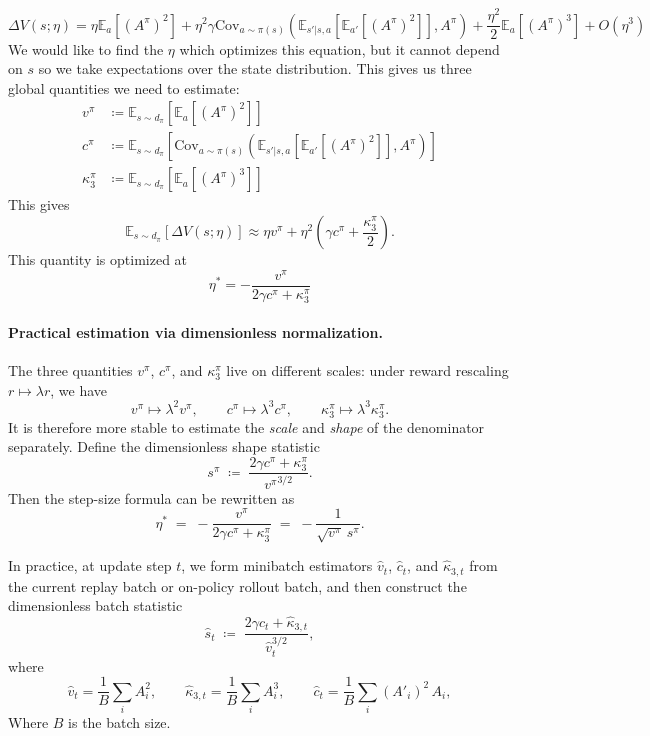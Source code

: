 \documentclass[11pt]{article}
\theoremstyle{definition}
\theoremstyle{remark}
\newcommand{\E}{\mathbb{E}}
\begin{document}
\begin{equation}
  \Delta V(s;\eta) = \eta\E_a[(A^\pi)^2] + \eta^2\gamma\mathrm{Cov}_{a\sim\pi(s)}(\E_{s'|s,a}[\E_{a'}[(A^\pi)^2]],A^\pi) + \frac{\eta^2}{2}\E_a[(A^\pi)^3] + O(\eta^3)
\end{equation}
We would like to find the $\eta$ which optimizes this equation, but it cannot depend on $s$ so we take expectations over the state distribution. This gives us three global quantities we need to estimate:
\begin{align}
    v^\pi &\coloneqq \E_{s\sim d_\pi}[\E_a[(A^\pi)^2]]\nonumber\\
    c^\pi &\coloneqq \E_{s\sim d_\pi}[\mathrm{Cov}_{a\sim\pi(s)}(\E_{s'|s,a}[\E_{a'}[(A^\pi)^2]],A^\pi)]\nonumber\\
    \kappa_3^\pi &\coloneqq \E_{s\sim d_\pi}[\E_a[(A^\pi)^3]]\nonumber
\end{align}
This gives
\begin{equation}
  \E_{s\sim d_\pi}[\Delta V(s;\eta)] \approx \eta v^\pi + \eta^2\left(\gamma c^\pi + \frac{\kappa_3^\pi}{2}\right).
\end{equation}
This quantity is optimized at
\begin{equation}\label{eq:eta-star}
  \boxed{\;\eta^* = -\frac{v^\pi}{2\gamma c^\pi + \kappa_3^\pi}\;}
\end{equation}


\paragraph{Practical estimation via dimensionless normalization.}
The three quantities $v^\pi$, $c^\pi$, and $\kappa_3^\pi$ live on different scales: under reward rescaling $r \mapsto \lambda r$, we have
\[
  v^\pi \mapsto \lambda^2 v^\pi,
  \qquad
  c^\pi \mapsto \lambda^3 c^\pi,
  \qquad
  \kappa_3^\pi \mapsto \lambda^3 \kappa_3^\pi.
\]
It is therefore more stable to estimate the \emph{scale} and \emph{shape} of the denominator separately. Define the dimensionless shape statistic
\begin{equation}
  s^\pi
  \;\coloneqq\;
  \frac{2\gamma c^\pi + \kappa_3^\pi}{{v^\pi}^{3/2}}.
\end{equation}
Then the step-size formula can be rewritten as
\begin{equation}
  \eta^*
  \;=\;
  -\frac{v^\pi}{2\gamma c^\pi + \kappa_3^\pi}
  \;=\;
  -\frac{1}{\sqrt{v^\pi}\,s^\pi}.
\end{equation}

In practice, at update step $t$, we form minibatch estimators $\hat v_t$, $\hat c_t$, and $\hat \kappa_{3,t}$ from the current replay batch or on-policy rollout batch, and then construct the dimensionless batch statistic
\begin{equation}
  \hat s_t
  \;\coloneqq\;
  \frac{2\gamma \hat c_t + \hat \kappa_{3,t}}{\hat v_t^{3/2}},
\end{equation}
where
\begin{equation}
  \hat v_t = \frac{1}{B}\sum_i A_i^2,
  \qquad
  \hat \kappa_{3,t} = \frac{1}{B}\sum_i A_i^3,
  \qquad
  \hat c_t = \frac{1}{B}\sum_i (A'_i)^2 \, A_i,
\end{equation}
Where $B$ is the batch size.
\end{document}
